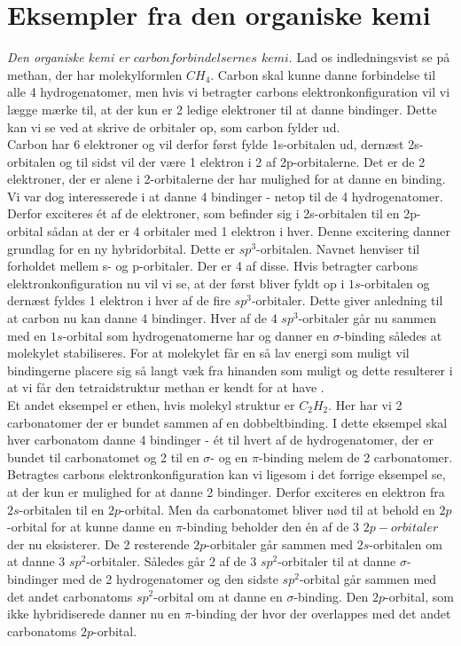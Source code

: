 \section{Eksempler fra den organiske kemi}

\emph{Den organiske kemi er $carbonforbindelsernes$ $kemi$}. Lad os indledningsvist se på methan, der har molekylformlen $CH_4$. Carbon skal kunne danne forbindelse til alle 4 hydrogenatomer, men hvis vi betragter carbons elektronkonfiguration vil vi lægge mærke til, at der kun er 2 ledige elektroner til at danne bindinger. Dette kan vi se ved at skrive de orbitaler op, som carbon fylder ud.
\\
Carbon har 6 elektroner og vil derfor først fylde 1s-orbitalen ud, dernæst 2s-orbitalen og til sidst vil der være 1 elektron i 2 af 2p-orbitalerne. Det er de 2 elektroner, der er alene i 2-orbitalerne der har mulighed for at danne en binding. Vi var dog interesserede i at danne 4 bindinger - netop til de 4 hydrogenatomer. Derfor exciteres ét af de elektroner, som befinder sig i 2s-orbitalen til en 2p-orbital sådan at der er 4 orbitaler med 1 elektron i hver. Denne excitering danner grundlag for en ny hybridorbital. Dette er $sp^3$-orbitalen. Navnet henviser til forholdet mellem s- og p-orbitaler. Der er 4 af disse. Hvis betragter carbons elektronkonfiguration nu vil vi se, at der først bliver fyldt op i $1s$-orbitalen og dernæst fyldes 1 elektron i hver af de fire $sp^3$-orbitaler. Dette giver anledning til at carbon nu kan danne 4 bindinger. Hver af de 4 $sp^3$-orbitaler går nu sammen med en $1s$-orbital som hydrogenatomerne har og danner en $\sigma$-binding således at molekylet stabiliseres. For at molekylet får en så lav energi som muligt vil bindingerne placere sig så langt væk fra hinanden som muligt og dette resulterer i at vi får den tetraidstruktur methan er kendt for at have . 
\\

Et andet eksempel er ethen, hvis molekyl struktur er $C_{2}H_2$. Her har vi 2 carbonatomer der er bundet sammen af en dobbeltbinding. I dette eksempel skal hver carbonatom danne 4 bindinger - ét til hvert af de hydrogenatomer, der er bundet til carbonatomet og 2 til en $\sigma$- og en $\pi$-binding melem de 2 carbonatomer. Betragtes carbons elektronkonfiguration kan vi ligesom i det forrige eksempel se, at der kun er mulighed for at danne 2 bindinger. Derfor exciteres en elektron fra $2s$-orbitalen til en $2p$-orbital. Men da carbonatomet bliver nød til at behold en $2p$-orbital for at kunne danne en $\pi$-binding beholder den én af de 3 $2p-orbitaler$ der nu eksisterer. De 2 resterende $2p$-orbitaler går sammen med $2s$-orbitalen om at danne 3 $sp^{2}$-orbitaler. Således går 2 af de 3 $sp^2$-orbitaler til at danne $\sigma$-bindinger med de 2 hydrogenatomer og den sidste $sp^2$-orbital går sammen med det andet carbonatoms $sp^2$-orbital om at danne en $\sigma$-binding. Den $2p$-orbital, som ikke hybridiserede danner nu en $\pi$-binding der hvor der overlappes med det andet carbonatoms $2p$-orbital. 

